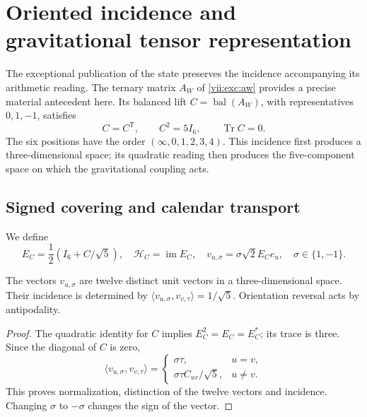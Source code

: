 \section{Oriented incidence and gravitational tensor representation}
\label{vii:vii:sec:pentacomponente}
The exceptional publication of the state preserves the incidence accompanying
its arithmetic reading. The ternary matrix \(A_W\) of
\eqref{vii:exc:aw} provides a precise material antecedent here. Its
balanced lift \(C=\operatorname{bal}(A_W)\), with representatives
\(0,1,-1\), satisfies
\[
 C=C^{\mathsf T},\qquad C^2=5I_6,\qquad \operatorname{Tr}C=0.
\]
The six positions have the order \((\infty,0,1,2,3,4)\).
This incidence first produces a three-dimensional space; its quadratic
reading then produces the five-component space on which
the gravitational coupling acts.

\subsection{Signed covering and calendar transport}
We define
\[
 E_C=\frac12(I_6+C/\sqrt5),\quad
 \mathcal H_C=\operatorname{im}E_C,\quad
 v_{u,\sigma}=\sigma\sqrt2E_Ce_u,\quad \sigma\in\{1,-1\}.
\]
\begin{proposition}
\label{vii:vii:prop:doce-orientadas}
The vectors \(v_{u,\sigma}\) are twelve distinct unit vectors
in a three-dimensional space. Their incidence is determined by
\(\langle v_{u,\sigma},v_{v,\tau}\rangle=1/\sqrt5\).
Orientation reversal acts by antipodality.
\end{proposition}
\begin{proof}
The quadratic identity for \(C\) implies \(E_C^2=E_C=E_C^*\);
its trace is three. Since the diagonal of \(C\) is zero,
\[
 \langle v_{u,\sigma},v_{v,\tau}\rangle
 =\begin{cases}\sigma\tau,&u=v,\\
 \sigma\tau C_{uv}/\sqrt5,&u\ne v.
 \end{cases}
\]
This proves normalization, distinction of the twelve vectors and incidence.
Changing \(\sigma\) to \(-\sigma\) changes the sign of the vector.
\end{proof}

